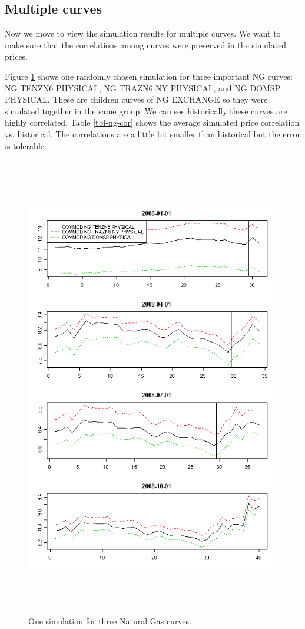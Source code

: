 \subsection{Multiple curves}
Now we move to view the simulation results for multiple curves.
We want to make sure that the correlations among curves
were preserved in the simulated prices. 

Figure \ref{three-ng} shows one randomly chosen simulation for three 
important NG curves:  NG TENZN6 PHYSICAL,  NG TRAZN6 NY PHYSICAL,
and  NG DOMSP PHYSICAL. These are children curves of NG EXCHANGE
so they were simulated together in the same group. 
We can see historically these
curves are highly correlated. Table \ref{tbl-ng-cor} shows the 
average simulated price correlation vs. historical. The correlations
are a little bit smaller than historical but the error is tolerable.
\begin{figure}[htbp]
\centering
\includegraphics[width=5.5in, height=8in]{figures/ng-multicurve.png}
\caption{One simulation for three Natural Gas curves.} 
\label{three-ng}
\end{figure}

